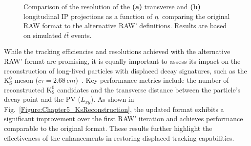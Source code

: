 \begin{figure}[!htbp]
    \caption[Resolution of IP projections vs $\eta$ for RAW and RAW']{Comparison of the resolution of the \textbf{(a)} transverse and \textbf{(b)} longitudinal \ac{IP} projections as a function of $\eta$, comparing the original RAW format to the alternative RAW' definitions. Results are based on simulated $t\bar{t}$ events.}
    \label{Figure:Chapter5_ResolutionComparison}
\end{figure}

While the tracking efficiencies and resolutions achieved with the alternative RAW' format are promising, it is equally important to assess its impact on the reconstruction of long-lived particles with displaced decay signatures, such as the $\mathrm{K}_\mathrm{S}^0$ meson ($c\tau = 2.68\,\unit{cm}$)~\cite{ParticleMasses}. Key performance metrics include the number of reconstructed $\mathrm{K}_\mathrm{S}^0$ candidates and the transverse distance between the particle’s decay point and the \ac{PV} ($L_{xy}$). As shown in Fig.~\ref{Figure:Chapter5_KsReconstruction}, the updated format exhibits a significant improvement over the first RAW' iteration and achieves performance comparable to the original format. These results further highlight the effectiveness of the enhancements in restoring displaced tracking capabilities.

